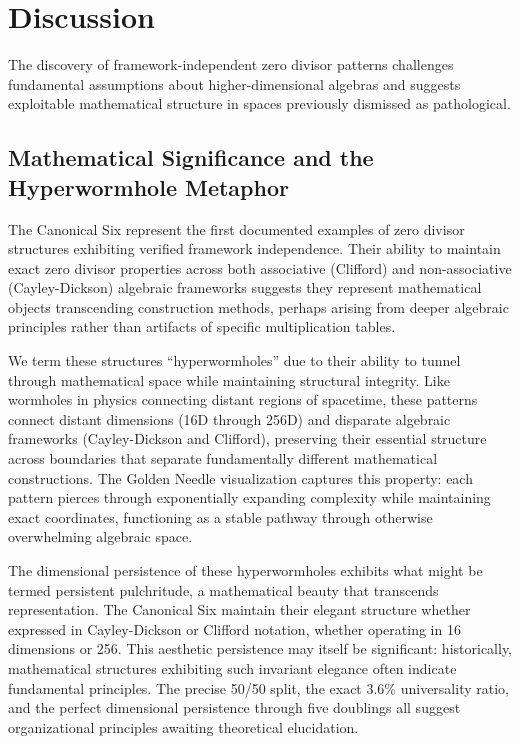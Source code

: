 \documentclass[11pt]{article}
\begin{document}
\section{Discussion}
\label{sec:discussion}

The discovery of framework-independent zero divisor patterns challenges fundamental assumptions about higher-dimensional algebras and suggests exploitable mathematical structure in spaces previously dismissed as pathological.

\subsection{Mathematical Significance and the Hyperwormhole Metaphor}

The Canonical Six represent the first documented examples of zero divisor structures exhibiting verified framework independence. Their ability to maintain exact zero divisor properties across both associative (Clifford) and non-associative (Cayley-Dickson) algebraic frameworks suggests they represent mathematical objects transcending construction methods, perhaps arising from deeper algebraic principles rather than artifacts of specific multiplication tables.

We term these structures ``hyperwormholes'' due to their ability to tunnel through mathematical space while maintaining structural integrity. Like wormholes in physics connecting distant regions of spacetime, these patterns connect distant dimensions (16D through 256D) and disparate algebraic frameworks (Cayley-Dickson and Clifford), preserving their essential structure across boundaries that separate fundamentally different mathematical constructions. The Golden Needle visualization captures this property: each pattern pierces through exponentially expanding complexity while maintaining exact coordinates, functioning as a stable pathway through otherwise overwhelming algebraic space.

The dimensional persistence of these hyperwormholes exhibits what might be termed persistent pulchritude, a mathematical beauty that transcends representation. The Canonical Six maintain their elegant structure whether expressed in Cayley-Dickson or Clifford notation, whether operating in 16 dimensions or 256. This aesthetic persistence may itself be significant: historically, mathematical structures exhibiting such invariant elegance often indicate fundamental principles. The precise 50/50 split, the exact 3.6\% universality ratio, and the perfect dimensional persistence through five doublings all suggest organizational principles awaiting theoretical elucidation.
\end{document}
